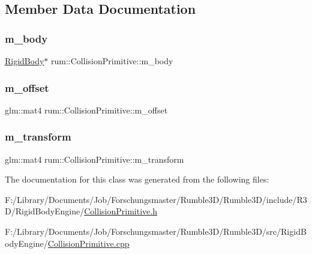 \subsection{Member Data Documentation}
\mbox{\label{classrum_1_1_collision_primitive_a9ef6e9862ac5e75330395368e401530e}} 
\subsubsection{\texorpdfstring{m\+\_\+body}{m\_body}}
{\footnotesize\ttfamily \hyperlink{classrum_1_1_rigid_body}{Rigid\+Body}$\ast$ rum\+::\+Collision\+Primitive\+::m\+\_\+body\hspace{0.3cm}{\ttfamily [protected]}}

\mbox{\label{classrum_1_1_collision_primitive_a1617f197d7dbf54801bb21fbcedf730e}} 
\subsubsection{\texorpdfstring{m\+\_\+offset}{m\_offset}}
{\footnotesize\ttfamily glm\+::mat4 rum\+::\+Collision\+Primitive\+::m\+\_\+offset\hspace{0.3cm}{\ttfamily [protected]}}

\mbox{\label{classrum_1_1_collision_primitive_a17dea68b6d2faa8573935fbaf4e81440}} 
\subsubsection{\texorpdfstring{m\+\_\+transform}{m\_transform}}
{\footnotesize\ttfamily glm\+::mat4 rum\+::\+Collision\+Primitive\+::m\+\_\+transform\hspace{0.3cm}{\ttfamily [protected]}}



The documentation for this class was generated from the following files\+:\begin{DoxyCompactItemize}
\item 
F\+:/\+Library/\+Documents/\+Job/\+Forschungsmaster/\+Rumble3\+D/\+Rumble3\+D/include/\+R3\+D/\+Rigid\+Body\+Engine/\hyperlink{_collision_primitive_8h}{Collision\+Primitive.\+h}\item 
F\+:/\+Library/\+Documents/\+Job/\+Forschungsmaster/\+Rumble3\+D/\+Rumble3\+D/src/\+Rigid\+Body\+Engine/\hyperlink{_collision_primitive_8cpp}{Collision\+Primitive.\+cpp}\end{DoxyCompactItemize}
